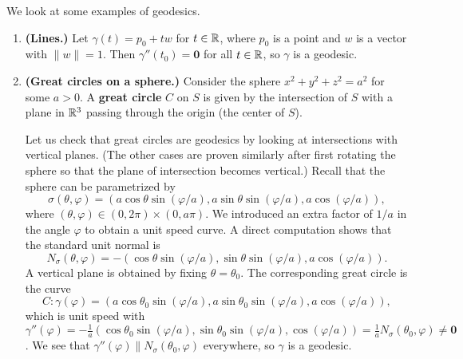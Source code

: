 We look at some examples of geodesics. 
\begin{enumerate}[(1)]
    \item {\bf (Lines.)} Let $\gamma(t) = p_0 + tw$ for $t \in \mathbb{R}$, 
    where $p_0$ is a point and $w$ is a vector with $\|w\| = 1$. 
    Then $\gamma''(t_0) = \mathbf 0$ for all $t \in \mathbb{R}$, so $\gamma$ is a geodesic.
    \item {\bf (Great circles on a sphere.)} Consider the sphere 
    $x^2 + y^2 + z^2 = a^2$ for some $a > 0$. A {\bf great circle} 
    $C$ on $S$ is given by the intersection of $S$ with a plane in $\mathbb{R}^3$ 
    passing through the origin (the center of $S$). 

    Let us check that great circles are geodesics by looking at intersections 
    with vertical planes. (The other cases are proven similarly 
    after first rotating the sphere so that the plane of intersection 
    becomes vertical.) Recall that the sphere can be parametrized by 
    \[ \sigma(\theta, \varphi) = (a\cos\theta\sin(\varphi/a), a\sin\theta
    \sin(\varphi/a), a\cos(\varphi/a)), \] 
    where $(\theta, \varphi) \in (0, 2\pi) \times (0, a\pi)$. We 
    introduced an extra factor of $1/a$ in the 
    angle $\varphi$ to obtain a unit speed curve.
    A direct computation shows that the standard unit normal is 
    \[ N_\sigma(\theta, \varphi) = -(\cos\theta \sin(\varphi/a), \sin\theta\sin(\varphi/a), 
    a\cos(\varphi/a)). \] 
    A vertical plane is obtained by fixing $\theta = \theta_0$. 
    The corresponding great circle is the curve 
    \[ C : \gamma(\varphi) = (a\cos\theta_0\sin(\varphi/a), a\sin\theta_0\sin(\varphi/a),
    a\cos(\varphi/a)), \] 
    which is unit speed with $\gamma''(\varphi) = 
    -\frac1a(\cos\theta_0\sin(\varphi/a), \sin\theta_0\sin(\varphi/a), 
    \cos(\varphi/a)) = \frac1a N_\sigma(\theta_0, \varphi) \neq \mathbf 0$.
    We see that $\gamma''(\varphi) \parallel N_\sigma(\theta_0, \varphi)$ 
    everywhere, so $\gamma$ is a geodesic. 
\end{enumerate}

